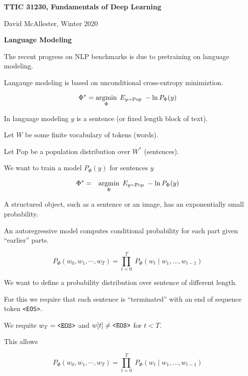 




{\Huge

  \centerline{\bf TTIC 31230, Fundamentals of Deep Learning}
  \bigskip
  \centerline{David McAllester, Winter 2020}
  \vfill
  \centerline{\bf Language Modeling}


The recent progress on NLP benchmarks is due to pretraining on language modeling.

\vfill
Langauge modeling is based on unconditional cross-entropy minimiztion.

\vfill
$$\Phi^* = \operatorname*{argmin}_\Phi \;E_{y \sim \mathrm{Pop}}\;-\ln P_\Phi(y)$$

\vfill
In language modeling $y$ is a sentence (or fixed length block of text).


Let $W$ be some finite vocabulary of tokens (words).

\vfill
Let $\mathrm{Pop}$ be a population distribution over $W^*$ (sentences).

\vfill
We want to train a model $P_\Phi(y)$ for sentences $y$

\begin{eqnarray*}
\Phi^* & = & \operatorname*{argmin}_\Phi \; E_{y \sim \mathrm{Pop}}\;-\ln P_\Phi(y)
\end{eqnarray*}


A structured object, such as a sentence or an image, has an exponentially small probability.

\vfill
An autoregressive model computes conditional probability for each part given ``earlier'' parts.

\vfill
$$P_\Phi(w_0, w_1, \cdots, w_T) = \prod_{t=0}^T\;P_\Phi(w_t\;|\;w_1,\ldots,w_{t-1})$$



We want to define a probability distribution over sentence of different length.

\vfill
For this we require that each sentence is ``terminated'' with an end of sequence token {\tt <EOS>}.

\vfill
We requite $w_T = \mbox{\tt <EOS>}$ and $w[t] \not = \mbox{\tt <EOS>}$ for $t < T$.

\vfill
This allows

$$P_\Phi(w_0, w_1, \cdots, w_T) = \prod_{t=0}^T\;P_\Phi(w_t\;|\;w_1,\ldots,w_{t-1})$$

}

